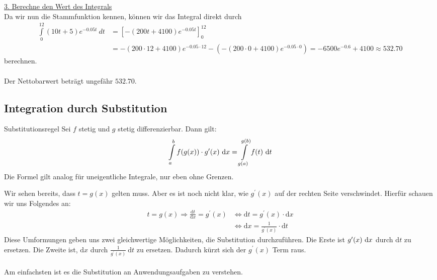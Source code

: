 \newpage
\underline{3. Berechne den Wert des Integrals}\\
Da wir nun die Stammfunktion kennen, können wir das Integral direkt durch
\begin{align*}
\int \limits_0^{12} (10t + 5) e^{-0.05 t} \ dt
&=  \left[ -(200 t +4100) e^{-0.05 t} \right]_0^{12}\\
&= -(200 \cdot 12 +4100) e^{-0.05 \cdot 12} - (-(200 \cdot 0 +4100) e^{-0.05 \cdot 0} ) 
= -6500 e^{-0.6 }+4100 
\approx 532.70
\end{align*}
berechnen.\\
\\
Der Nettobarwert beträgt ungefähr $532.70$.

\newpage
\subsection{Integration durch Substitution}
\begin{mybox}{Substitutionsregel}
Sei $f$ stetig und $g$ stetig differenzierbar.
Dann gilt:
\begin{align*}
\int \limits_a^b f( g(x)) \cdot g^\prime(x) \ \text{\rmfamily d} x = 
\int \limits_{g(a)}^{g(b)} f(t) \ \text{\rmfamily d} t
\end{align*}
Die Formel gilt analog für uneigentliche Integrale, nur eben ohne Grenzen.
\end{mybox}
Wir sehen bereits, dass $t = g(x) $ gelten muss.
Aber es ist noch nicht klar, wie $g^\prime(x)$ auf der rechten Seite verschwindet.
Hierfür schauen wir uns Folgendes an:
\begin{align*}
t = g(x) 
\Rightarrow
\frac{\mathrm{d} t}{\mathrm{d} x} = g^\prime(x) 
&\Leftrightarrow
\mathrm{d} t = g^\prime(x) \cdot \mathrm{d} x\\
&\Leftrightarrow
\mathrm{d} x = \frac{1}{g^\prime(x) } \cdot \mathrm{d} t
\end{align*}
Diese Umformungen geben uns zwei gleichwertige Möglichkeiten, die Substitution durchzuführen.
Die Erste ist $g^\prime(x)  \ \text{\rmfamily d} x $ durch $\mathrm{d} t$ zu ersetzen.
Die Zweite ist, $\mathrm{d} x$ durch $\frac{1}{g^\prime(x) } \ \mathrm{d} t$ zu ersetzen.
Dadurch kürzt sich der $g^\prime(x)$ Term raus.\\ \\
Am einfachsten ist es die Substitution an Anwendungsaufgaben zu verstehen.
\newpage
